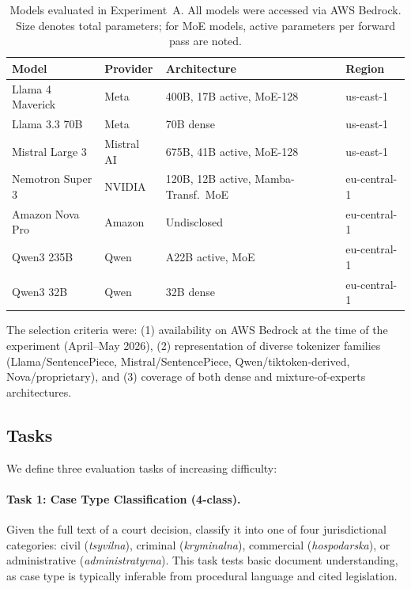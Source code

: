 \documentclass[11pt,a4paper]{article}
\begin{document}
\begin{table}[t]
\centering
\caption{Models evaluated in Experiment~A. All models were accessed via AWS Bedrock. Size denotes total parameters; for MoE models, active parameters per forward pass are noted.}
\label{tab:models}
\begin{tabular}{llll}
\toprule
\textbf{Model} & \textbf{Provider} & \textbf{Architecture} & \textbf{Region} \\
\midrule
Llama 4 Maverick   & Meta      & 400B, 17B active, MoE-128 & us-east-1 \\
Llama 3.3 70B      & Meta      & 70B dense                  & us-east-1 \\
Mistral Large 3    & Mistral AI & 675B, 41B active, MoE-128 & us-east-1 \\
Nemotron Super 3   & NVIDIA    & 120B, 12B active, Mamba-Transf.\ MoE & eu-central-1 \\
Amazon Nova Pro    & Amazon    & Undisclosed                & eu-central-1 \\
Qwen3 235B         & Qwen      & A22B active, MoE           & eu-central-1 \\
Qwen3 32B          & Qwen      & 32B dense                  & eu-central-1 \\
\bottomrule
\end{tabular}
\end{table}

The selection criteria were: (1) availability on AWS Bedrock at the time of the experiment (April--May 2026), (2) representation of diverse tokenizer families (Llama/SentencePiece, Mistral/SentencePiece, Qwen/tiktoken-derived, Nova/proprietary), and (3) coverage of both dense and mixture-of-experts architectures.

\subsection{Tasks}
\label{sec:tasks}

We define three evaluation tasks of increasing difficulty:

\paragraph{Task 1: Case Type Classification (4-class).}
Given the full text of a court decision, classify it into one of four jurisdictional categories: civil (\textit{tsyvilna}), criminal (\textit{kryminalna}), commercial (\textit{hospodarska}), or administrative (\textit{administratyvna}). This task tests basic document understanding, as case type is typically inferable from procedural language and cited legislation.
\end{document}
